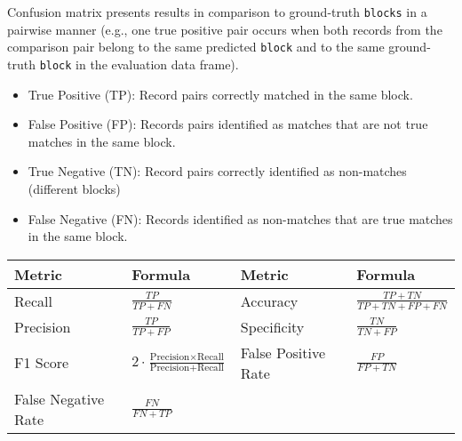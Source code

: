 Confusion matrix presents results in comparison to ground-truth
\texttt{blocks} in a pairwise manner (e.g., one true positive pair
occurs when both records from the comparison pair belong to the same
predicted \texttt{block} and to the same ground-truth \texttt{block} in
the evaluation data frame).

\begin{itemize}
\tightlist
\item
  True Positive (TP): Record pairs correctly matched in the same
  block.
\item
  False Positive (FP): Records pairs identified as matches that are
  not true matches in the same block.
\item
  True Negative (TN): Record pairs correctly identified as non-matches
  (different blocks)
\item
  False Negative (FN): Records identified as non-matches that are true
  matches in the same block.
\end{itemize}

\begin{longtable}[]{@{}
  >{\raggedright\arraybackslash}p{}
  >{\raggedright\arraybackslash}p{}
  >{\raggedright\arraybackslash}p{}
  >{\raggedright\arraybackslash}p{}@{}}
\toprule\noalign{}
\begin{minipage}[b]{\linewidth}\raggedright
\textbf{Metric}
\end{minipage} & \begin{minipage}[b]{\linewidth}\raggedright
\textbf{Formula}
\end{minipage} & \begin{minipage}[b]{\linewidth}\raggedright
\textbf{Metric}
\end{minipage} & \begin{minipage}[b]{\linewidth}\raggedright
\textbf{Formula}
\end{minipage} \\
\midrule\noalign{}
\endhead
\bottomrule\noalign{}
\endlastfoot
Recall & \(\frac{TP}{TP + FN}\) & Accuracy & \(\frac{TP + TN}{TP + TN + FP + FN}\) \\
Precision & \(\frac{TP}{TP + FP}\) & Specificity & \(\frac{TN}{TN + FP}\) \\
F1 Score & \(2 \cdot \frac{\text{Precision} \times \text{Recall}}{\text{Precision} + \text{Recall}}\) & False Positive Rate & \(\frac{FP}{FP + TN}\) \\
False Negative Rate & \(\frac{FN}{FN + TP}\) & & \\
\end{longtable}

